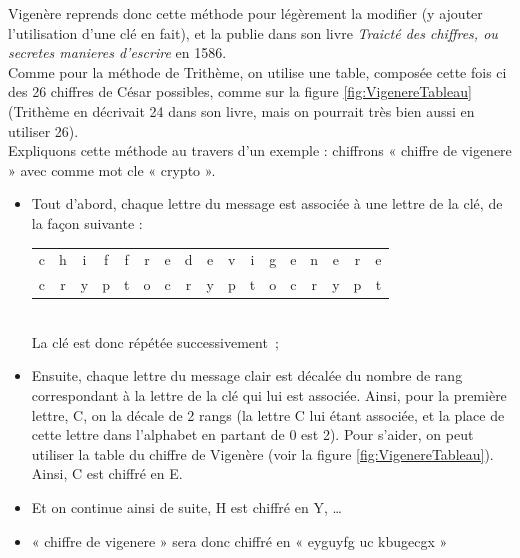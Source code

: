 Vigenère reprends donc cette méthode pour légèrement la modifier (y
ajouter l'utilisation d'une clé en fait), et la publie dans son livre
\emph{Traicté des chiffres, ou secretes
  manieres d'escrire} en 1586. \\

Comme pour la méthode de Trithème, on utilise une table, composée
cette fois ci des 26 chiffres de César possibles, comme sur la figure
\ref{fig:VigenereTableau} (Trithème en décrivait 24 dans son livre,
mais on pourrait très bien aussi en utiliser 26). \\

Expliquons cette méthode au travers d'un exemple : chiffrons « chiffre
de vigenere » avec comme mot cle « crypto ».
\begin{itemize}
  \item Tout d'abord, chaque lettre du message est associée à une
    lettre de la clé, de la façon suivante : \\
    \begin{tabular}{c@{}c@{}c@{}c@{}c@{}c@{}cc@{}cc@{}c@{}c@{}c@{}c@{}c@{}c@{}c}
      c & h & i & f & f & r & e &
      d & e &
      v & i & g & e & n & e & r & e \\

      c & r & y & p & t & o & c & 
      r & y & 
      p & t & o & c & r & y & p & t \\
    \end{tabular}\\
    La clé est donc répétée successivement~;
  \item Ensuite, chaque lettre du message clair est décalée du nombre
    de rang correspondant à la lettre de la clé qui lui est
    associée. Ainsi, pour la première lettre, C, on la décale de 2
    rangs (la lettre C lui étant associée, et la place de cette lettre
    dans l'alphabet en partant de 0 est 2). Pour s'aider, on peut
    utiliser la table du chiffre de Vigenère (voir la figure
    \ref{fig:VigenereTableau}). \\
    Ainsi, C est chiffré en E.
  \item Et on continue ainsi de suite, H est chiffré en Y, \dots
  \item « chiffre de vigenere » sera donc chiffré en « eyguyfg uc
    kbugecgx »
\end{itemize}

